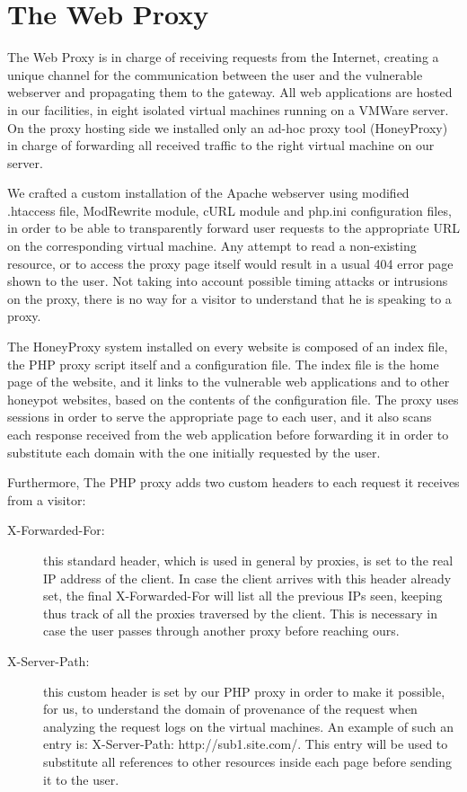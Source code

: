 \section{The Web Proxy}

The Web Proxy is in charge of receiving requests from the Internet, creating a unique channel for the communication between the user and the vulnerable webserver and propagating them to the gateway.
All web applications are hosted in our facilities, in eight isolated virtual machines running on a VMWare server. On the proxy hosting side we installed only an ad-hoc proxy tool (HoneyProxy) in charge of forwarding all received traffic to the right virtual machine on our server.

We crafted a custom installation of the Apache webserver using modified .htaccess file, ModRewrite module, cURL module and php.ini configuration files, in order to be able to transparently forward user requests to the appropriate URL on the corresponding virtual machine. Any attempt to read a non-existing resource, or to access the proxy page itself would result in a usual 404 error page shown to the user. Not taking into account possible timing attacks or intrusions on the proxy, there is no way for a visitor to understand that he is speaking to a proxy.

The HoneyProxy system installed on every website is composed of an index file, the PHP proxy script itself and a configuration file. The index file is the home page of the website, and it links to the vulnerable web applications and to other honeypot websites, based on the contents of the configuration file. The proxy uses sessions in order to serve the appropriate page to each user, and it also scans each response received from the web application before forwarding it in order to substitute each domain with the one initially requested by the user.

Furthermore, The PHP proxy adds two custom headers to each request it receives from a visitor:

\begin{description}
\item[X-Forwarded-For: ] this standard header, which is used in general by proxies, is set to the real IP address of the client. In case the client arrives with this header already set, the final X-Forwarded-For will list all the previous IPs seen, keeping thus track of all the proxies traversed by the client. This is necessary in case the user passes through another proxy before reaching ours.

\item[X-Server-Path: ] this custom header is set by our PHP proxy in order to make it possible, for us, to understand the domain of provenance of the request when analyzing the request logs on the virtual machines. An example of such an entry is: X-Server-Path: http://sub1.site.com/. This entry will be used to substitute all references to other resources inside each page before sending it to the user.
\end{description}

